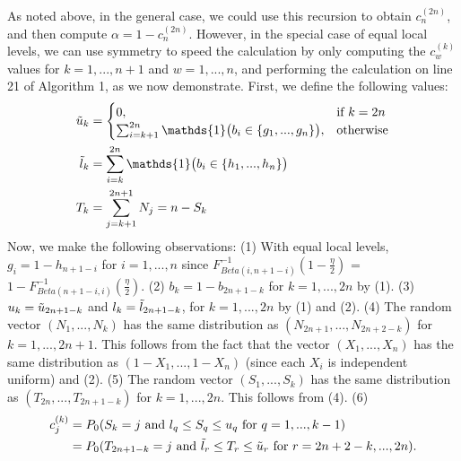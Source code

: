 \documentclass[article]{jss}
\begin{document}
\newline
As noted above, in the general case, we could use this recursion to obtain $c_{n}^{(2n)}$, and then compute $\alpha = 1 - c_{n}^{(2n)}$. However, in the special case of equal local levels, we can use symmetry to speed the calculation by only computing the $c_{w}^{(k)}$ values for $k = 1, ..., n+1$ and $w = 1, ..., n$, and performing the calculation on line 21 of Algorithm 1, as we now demonstrate. First, we define the following values:
%
\begin{align*}
\Tilde{u}_{k} &=
    \begin{cases}
      0, & \text{if}\ k = 2n \\
      \sum_{i = k + 1}^{2n} \mathds{1} \big(b_{i} \in \{g_{1}, ..., g_{n}\}\big), & \text{otherwise}
    \end{cases}\\
    \Tilde{l}_{k} &=
      \sum_{i = k}^{2n} \mathds{1} \big(b_{i} \in \{h_{1}, ..., h_{n}\}\big)\\
    T_{k} &= \sum_{j = k + 1}^{2n + 1}N_{j} = n - S_{k}
\end{align*}
%
Now, we make the following observations:
\newline
\newline
(1) With equal local levels, $g_{i} = 1 - h_{n + 1 - i}$ for $i = 1, ..., n$ since $F_{Beta(i, n + 1 - i)}^{-1}(1 - \frac{\eta}{2})$ = $1 - F_{Beta(n + 1 - i, i)}^{-1}(\frac{\eta}{2})$.
\newline
\newline
(2) $b_{k} = 1 - b_{2n + 1 - k}$ for $k = 1, ..., 2n$ by (1). 
\newline
\newline
(3) $u_{k} = \Tilde{u}_{2n + 1 - k}$ and $l_{k} = \Tilde{l}_{2n + 1 - k}$, for $k = 1,..., 2n$ by (1) and (2).
\newline
\newline
(4) The random vector $(N_{1}, ..., N_{k})$ has the same distribution as $(N_{2n + 1}, ..., N_{2n+2-k})$ for $k = 1, ..., 2n + 1$. This follows from the fact that the vector $(X_{1}, ..., X_{n})$ has the same distribution as $(1 - X_{1}, ..., 1 - X_{n})$ (since each $X_{i}$ is independent uniform) and (2).
\newline
\newline
(5) The random vector $(S_{1}, ..., S_{k})$ has the same distribution as $(T_{2n}, ..., T_{2n + 1 - k})$ for $k = 1, ..., 2n$. This follows from (4). 
\newline
\newline
(6)
%
\begin{align*}
    c_{j}^{(k)} &= P_{0}(S_{k} = j \textrm{ and } l_{q} \leq S_{q} \leq u_{q} \textrm{ for } q = 1, ..., k - 1)\\
    &= P_{0}(T_{2n + 1 - k} = j \textrm{ and } \Tilde{l}_{r} \leq T_{r} \leq \Tilde{u}_{r} \textrm{ for } r = 2n + 2 - k, ..., 2n).\\
\end{align*}
\end{document}
